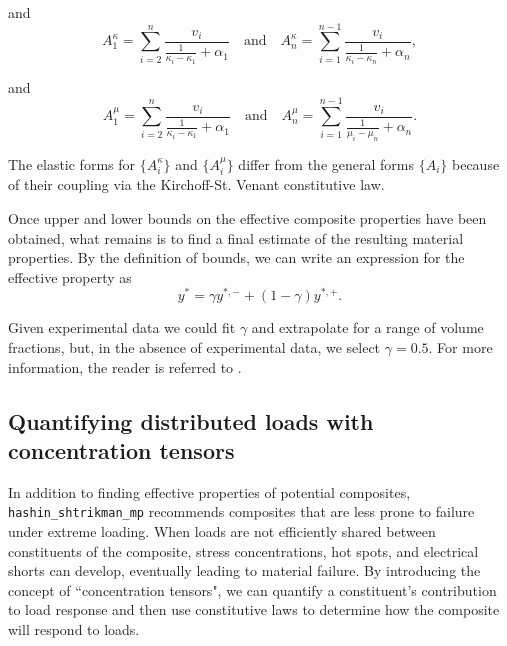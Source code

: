 \documentclass[letterpaper,12pt]{formatfile}
\begin{document}
\noindent and
\begin{equation}
A_{1}^{\kappa} = \sum\limits_{i=2}^{n} \frac{v_{i}}{\frac{1}{\kappa_{i} - \kappa_{1}} + \alpha_{1}}
\quad \text{and} \quad
A_{n}^{\kappa} = \sum\limits_{i=1}^{n-1} \frac{v_{i}}{\frac{1}{\kappa_{i} - \kappa_{n}} + \alpha_{n}}, 
\label{eqn:bulk_As}
\end{equation}

\noindent and
\begin{equation}
A_{1}^{\mu} = \sum\limits_{i=2}^{n} \frac{v_{i}}{\frac{1}{\kappa_{i} - \kappa_{1}} + \alpha_{1}}
\quad \text{and} \quad
A_{n}^{\mu} = \sum\limits_{i=1}^{n-1} \frac{v_{i}}{\frac{1}{\mu_{i} - \mu_{n}} + \alpha_{n}}.
\label{eqn:shear_As}
\end{equation}

\noindent The elastic forms for $\{A_{i}^{\kappa}\}$ and $\{A_{i}^{\mu}\}$ differ from the general forms $\{A_{i}\}$ because of their coupling via the Kirchoff-St. Venant constitutive law.

Once upper and lower bounds on the effective composite properties have been obtained, what remains is to find a final estimate of the resulting material properties. By the definition of bounds, we can write an expression for the effective property as
\begin{equation}
y^{*} = \gamma y^{*,-} + (1-\gamma) y^{*,+}.
\label{eqn:mixing-param}
\end{equation}

\noindent Given experimental data we could fit $\gamma$ and extrapolate for a range of volume fractions, but, in the absence of experimental data, we select $\gamma = 0.5$. For more information, the reader is referred to \cite{zohdi-course-reader}.

\subsection{Quantifying distributed loads with concentration tensors} \label{subsec:conc-facs}
In addition to finding effective properties of potential composites, \verb|hashin_shtrikman_mp| recommends composites that are less prone to failure under extreme loading. When loads are not efficiently shared between constituents of the composite, stress concentrations, hot spots, and electrical shorts can develop, eventually leading to material failure. By introducing the concept of ``concentration tensors", we can quantify a constituent's contribution to load response and then use constitutive laws to determine how the composite will respond to loads. 
\end{document}
